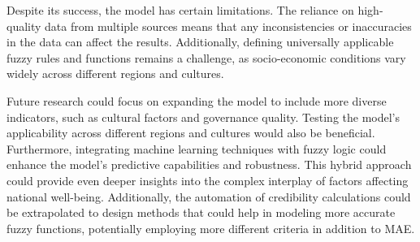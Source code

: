 \documentclass[fleqn,11pt]{article}
\begin{document}
Despite its success, the model has certain limitations. The reliance on high-quality data from multiple sources means that any inconsistencies or inaccuracies in the data can affect the results. Additionally, defining universally applicable fuzzy rules and functions remains a challenge, as socio-economic conditions vary widely across different regions and cultures.

Future research could focus on expanding the model to include more diverse indicators, such as cultural factors and governance quality. Testing the model's applicability across different regions and cultures would also be beneficial. Furthermore, integrating machine learning techniques with fuzzy logic could enhance the model's predictive capabilities and robustness. This hybrid approach could provide even deeper insights into the complex interplay of factors affecting national well-being. Additionally, the automation of credibility calculations could be extrapolated to design methods that could help in modeling more accurate fuzzy functions, potentially employing more different criteria in addition to MAE.
\end{document}
